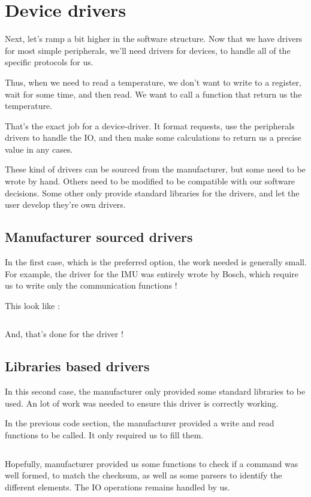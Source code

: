\section{Device drivers}
Next, let's ramp a bit higher in the software structure. Now that we have drivers for
most simple peripherals, we'll need drivers for devices, to handle all of the specific
protocols for us.

Thus, when we need to read a temperature, we don't want to write to a register, wait for
some time, and then read. We want to call a function that return us the temperature.

That's the exact job for a device-driver.
It format requests, use the peripherals drivers to handle the IO, and then make some
calculations to return us a precise value in any cases.

These kind of drivers can be sourced from the manufacturer, but some need to be wrote by
hand. Others need to be modified to be compatible with our software decisions. Some
other only provide standard libraries for the drivers, and let the user develop they're
own drivers.

\subsection{Manufacturer sourced drivers}
In the first case, which is the preferred option, the work needed is generally small.
For example, the driver for the IMU was entirely wrote by Bosch, which require us to
write only the communication functions !

This look like :
\inputminted[linenos, firstline=19471, lastline=19484]{cpp}{\Code/drivers/bno055/bno055.cpp}

And, that's done for the driver !

\subsection{Libraries based drivers}
In this second case, the manufacturer only provided some standard libraries to be used.
An lot of work was needed to ensure this driver is correctly working.

In the previous code section, the manufacturer provided a write and read functions to be
called. It only required us to fill them.

\inputminted[linenos, firstline=311, lastline=315]{cpp}{\Code/drivers/teseo/teseo.cpp}

Hopefully, manufacturer provided us some functions to check if a command was well
formed, to match the checksum, as well as some parsers to identify the different
elements. The IO operations remains handled by us.

